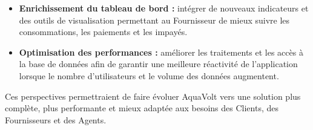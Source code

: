 \begin{itemize}
    \item \textbf{Enrichissement du tableau de bord :} intégrer de nouveaux indicateurs et des outils de visualisation permettant au Fournisseur de mieux suivre les consommations, les paiements et les impayés.

    \item \textbf{Optimisation des performances :} améliorer les traitements et les accès à la base de données afin de garantir une meilleure réactivité de l'application lorsque le nombre d'utilisateurs et le volume des données augmentent.
\end{itemize}

Ces perspectives permettraient de faire évoluer AquaVolt vers une solution plus complète, plus performante et mieux adaptée aux besoins des Clients, des Fournisseurs et des Agents.
